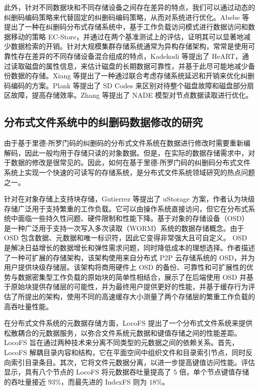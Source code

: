 此外，针对不同数据块和不同存储设备之间存在差异的特点，我们可以通过动态的纠删码编码策略来代替固定的纠删码编码策略，从而对系统进行优化。Abebe 等\cite{abebe2018ec}提出了一种在纠删码分布式存储系统中，基于工作负载访问模式进行数据访问和数据移动的策略 EC-Store，并通过在两个基准测试上的评估，证明其可以显著地减少数据检索的开销。针对大规模集群存储系统通常为异构存储架构，常常是使用可靠性存在差异的不同存储设备混合组成的特点，Kadekodi 等\cite{kadekodi2019cluster}提出了 HeART，通过读取磁盘的属性信息，来估计磁盘的长期数据可靠性，并基于此尽可能地减少备份数据的存储。Xiang 等\cite{xiang2015joint}提出了一种通过联合考虑存储系统延迟和开销来优化纠删码编码的方案。Plank 等\cite{plank2014sector}提出了 SD Codes 来区别对待整个磁盘故障和磁盘部分扇区故障，提高存储效率。Zhang 等\cite{zhang2019nade}提出了 NADE 模型对节点数据读取进行优化。
\subsection{分布式文件系统中的纠删码数据修改的研究}
由于基于里德-所罗门码的纠删码的分布式文件系统在数据进行修改时需要重新编解码，因此一般均用于存储只读的对象数据。但是，在实际的数据存储需求中，对于数据的修改是很常见的。因此，如何在基于里德-所罗门码的纠删码分布式文件系统上实现一个快速的可读写的存储系统，是分布式文件系统领域研究的热点问题之一。

针对在对象存储上支持块存储，Gutierrez 等\cite{gutierrez2017ustorage}提出了 uStorage 方案，作者认为块级存储广泛用于支持繁重的工作负载。它可以由操作系统直接访问，但它在分布式系统中面临一些持久性问题、硬件限制和性能下降。基于对象的存储设备（OSD）是一种广泛用于支持一次写入多次读取（WORM）系统的数据存储概念。由于 OSD 包含数据、元数据和唯一标识符，因此它变得非常强大且可自定义。 OSD 是解决日益增长的数据增长和弹性需求问题，同时降低成本的理想选择。作者描述了一种可扩展的存储架构，该架构使用来自分布式 P2P 云存储系统的 OSD，并为用户提供块级存储层。该架构将商用硬件上 OSD 的备份、可靠性和可扩展性的优势与数据密集型工作负载的原始块的简单性相结合，展示了在后端使用 OSD 并基于原始块提供存储层的可能性，并为最终用户提供更好的性能，并基于缓存行为评估了所提出的架构，使用不同的高速缓存大小测量了两个存储层的繁重工作负载的高吞吐量性能。

在分布式文件系统的元数据存储方面，LocoFS 提出了一个分布式文件系统来提供松散耦合的元数据服务\cite{li2017locofs}，以弥合文件系统元数据和键值存储之间的性能差距。LocoFS 旨在通过两种技术来分离不同类型的元数据之间的依赖关系。首先，LocoFS 解耦目录内容和结构，它在平面空间中组织文件和目录索引节点，同时反向索引目录条目。其次，它将文件元数据分离，以进一步提高键值访问性能。评估显示，具有八个节点的 LocoFS 将元数据吞吐量提高了 5 倍，单个节点键值存储的吞吐量接近 $93\%$，而最先进的 IndexFS 则为 $18\%$。

